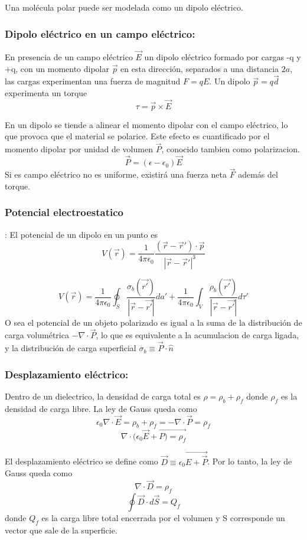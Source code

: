 \documentclass[a4paper, 10pt]{article}
\begin{document}
\begin{multicols*}{2}
	Una molécula polar puede ser modelada como un dipolo eléctrico.
	    
	\subsubsection{Dipolo eléctrico en un campo eléctrico:} En presencia de un campo eléctrico $\vec{E}$ un dipolo eléctrico formado por cargas -q y +q, con un momento dipolar $\vec{p}$ en esta dirección, separados a una distancia $2a$, las cargas experimentan una fuerza de magnitud $F=qE$. Un dipolo $\vec{p} =q \vec{d}$ experimenta un torque 
	$$\tau = \vec{p} \times \vec{E}$$
	    
	En un dipolo se tiende a alinear el momento dipolar con el campo eléctrico, lo que provoca que el material se polarice. Este efecto es cuantificado por el momento dipolar por unidad de volumen $\vec{P}$, conocido tambien como polarizacion.
	$$\vec{P} = (\epsilon - \epsilon_0) \vec{E}$$
	Si es campo eléctrico no es uniforme, existirá una fuerza neta $\vec{F}$ además del torque.
	    
	\subsubsection{Potencial electroestatico}: El potencial de un dipolo en un punto es 
	$$V(\vec{r})=\frac{1}{4 \pi \epsilon_0} \frac{(\vec{r}- \vec{r}') \cdot \vec{p}}{|\vec{r}- \vec{r}'|^3}$$
	    
	$$V(\vec{r}) = \frac{1}{4 \pi \epsilon_0} \oint_S \frac{\sigma_b (\vec{r'})}{|\vec{r}-\vec{r'}|}da' + \frac{1}{4 \pi \epsilon_0} \int_V \frac{\rho_b(\vec{r'})}{|\vec{r}-\vec{r'}|} d \tau '$$
	O sea el potencial de un objeto polarizado es igual a la suma de la distribución de carga volumétrica $-\nabla \cdot \vec{P}$, lo que es equivalente a la acumulacion de carga ligada, y la distribución de carga superficial $\sigma_b \equiv \vec{P} \cdot \hat{n}$
	    
	\subsubsection{Desplazamiento eléctrico:} Dentro de un dielectrico, la densidad de carga total es $\rho = \rho_b + \rho_f$ donde $\rho_f$ es la densidad de carga libre.
	La ley de Gauss queda como 
	$$\epsilon_0 \nabla \cdot \vec{E} = \rho _b + \rho_f = - \nabla \cdot \vec{P} = \rho _f$$
	$$\nabla \cdot (\epsilon_0 \vec{E} + \vec{P) = \rho _f}$$
	    
	El desplazamiento eléctrico se define como $\vec{D} \equiv \epsilon_0 \vec{E + \vec{P}}$. Por lo tanto, la ley de Gauss queda como
	$$\nabla \cdot \vec{D} = \rho_f$$
	$$\oint \vec{D} \cdot d\vec{S}= Q_f$$
	donde $Q_f $ es la carga libre total encerrada por el volumen y S corresponde un vector que sale de la superficie.
	    

\end{multicols*}
\end{document}

